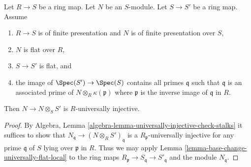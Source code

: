 \begin{lemma}
\label{lemma-base-change-universally-flat}
Let $R \to S$ be a ring map.
Let $N$ be an $S$-module.
Let $S \to S'$ be a ring map.
Assume
\begin{enumerate}
\item $R \to S$ is of finite presentation and $N$ is of finite presentation
over $S$,
\item $N$ is flat over $R$,
\item $S \to S'$ is flat, and
\item the image of $\Spec(S') \to \Spec(S)$ contains
all primes $\mathfrak q$ such that $\mathfrak q$ is an associated prime
of $N \otimes_R \kappa(\mathfrak p)$ where $\mathfrak p$ is the inverse
image of $\mathfrak q$ in $R$.
\end{enumerate}
Then $N \to N \otimes_S S'$ is $R$-universally injective.
\end{lemma}

\begin{proof}
By
Algebra, Lemma \ref{algebra-lemma-universally-injective-check-stalks}
it suffices to show that $N_{\mathfrak q} \to (N \otimes_R S')_{\mathfrak q}$
is a $R_{\mathfrak p}$-universally injective for any prime $\mathfrak q$
of $S$ lying over $\mathfrak p$ in $R$. Thus we may apply
Lemma \ref{lemma-base-change-universally-flat-local}
to the ring maps
$R_{\mathfrak p} \to S_{\mathfrak q} \to S'_{\mathfrak q}$
and the module $N_{\mathfrak q}$.
\end{proof}
